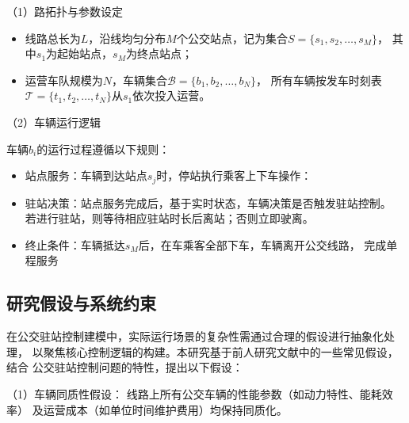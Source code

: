 （1）路拓扑与参数设定
\begin{itemize}
    \item 线路总长为$L$，沿线均匀分布$M$个公交站点，记为集合$S = \{s_1, s_2, \ldots, s_M\}$，
    其中$s_1$为起始站点，$s_M$为终点站点；
    \item 运营车队规模为$N$，车辆集合$\mathcal{B}  = \{b_1, b_2, \ldots, b_N\}$，
    所有车辆按发车时刻表$\mathcal{T} = \{t_1, t_2, \ldots, t_N\}$从$s_1$依次投入运营。
\end{itemize}

（2）车辆运行逻辑

车辆$b_i$的运行过程遵循以下规则：
\begin{itemize}
    \item 站点服务：车辆到达站点$s_j$时，停站执行乘客上下车操作：
    \item 驻站决策：站点服务完成后，基于实时状态，车辆决策是否触发驻站控制。
    若进行驻站，则等待相应驻站时长后离站；否则立即驶离。
    \item 终止条件：车辆抵达$s_M$后，在车乘客全部下车，车辆离开公交线路，
    完成单程服务
\end{itemize}






\subsection{研究假设与系统约束}
在公交驻站控制建模中，实际运行场景的复杂性需通过合理的假设进行抽象化处理，
以聚焦核心控制逻辑的构建。本研究基于前人研究文献中的一些常见假设，结合
公交驻站控制问题的特性，提出以下假设：

（1）车辆同质性假设：
线路上所有公交车辆的性能参数（如动力特性、能耗效率）
及运营成本（如单位时间维护费用）均保持同质化。

